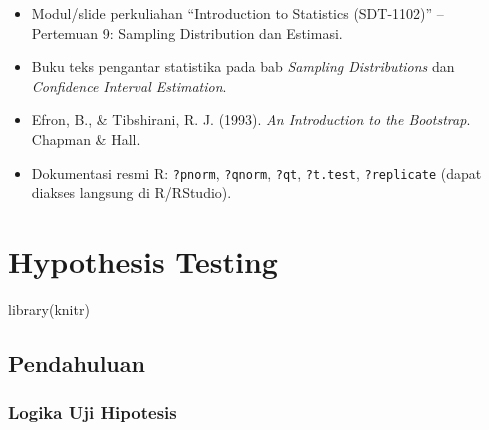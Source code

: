 \documentclass[
  indonesian,
  letterpaper,
]{book}
\newenvironment{Shaded}{\begin{snugshade}}{\end{snugshade}}
\newcommand{\FunctionTok}[1]{\textcolor[rgb]{0.28,0.35,0.67}{#1}}
\newcommand{\NormalTok}[1]{\textcolor[rgb]{0.00,0.23,0.31}{#1}}
\providecommand{\tightlist}{%
  \setlength{\itemsep}{0pt}\setlength{\parskip}{0pt}}
\begin{document}
\begin{itemize}
\tightlist
\item
  Modul/slide perkuliahan ``Introduction to Statistics (SDT-1102)'' --
  Pertemuan 9: Sampling Distribution dan Estimasi.
\item
  Buku teks pengantar statistika pada bab \emph{Sampling Distributions}
  dan \emph{Confidence Interval Estimation}.
\item
  Efron, B., \& Tibshirani, R. J. (1993). \emph{An Introduction to the
  Bootstrap}. Chapman \& Hall.
\item
  Dokumentasi resmi R: \texttt{?pnorm}, \texttt{?qnorm}, \texttt{?qt},
  \texttt{?t.test}, \texttt{?replicate} (dapat diakses langsung di
  R/RStudio).
\end{itemize}


\chapter{Hypothesis Testing}\label{hypothesis-testing}

\begin{Shaded}
\begin{Highlighting}[]
\FunctionTok{library}\NormalTok{(knitr)}
\end{Highlighting}
\end{Shaded}

\section{Pendahuluan}\label{pendahuluan-1}

\subsection{Logika Uji Hipotesis}\label{logika-uji-hipotesis}
\end{document}
